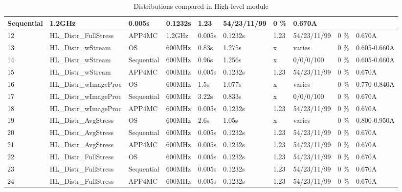 {\begin{table}[!ht]
{\begin{tabular}{|l|l|l|l|l|l|l|l|l|l|}
				Sequential &
				1.2GHz &
				0.005s &
				0.1232s &
				1.23 &
				54/23/11/99 &
				0 \% &
				0.670A \\
				\hline
				\hline
				12 &
				HL{\_}Distr{\_}FullStress &
				APP4MC &
				1.2GHz &
				0.005s &
				0.1232s &
				1.23 &
				54/23/11/99 &
				0 \% &
				0.670A \\
				\hline
				\hline
				13 &
				HL{\_}Distr{\_}wStream &
				OS &
				600MHz &
				0.83s &
				1.275s &
				x &
				varies &
				0 \% &
				0.605-0.660A \\
				\hline
				\hline
				14 &
				HL{\_}Distr{\_}wStream &
				Sequential &
				600MHz &
				0.96s &
				1.256s &
				x &
				0/0/0/100 &
				0 \% &
				0.605-0.660A \\
				\hline
				\hline
				15 &
				HL{\_}Distr{\_}wStream &
				APP4MC &
				600MHz &
				0.005s &
				0.1232s &
				1.23 &
				54/23/11/99 &
				0 \% &
				0.670A \\
				\hline
				\hline
				16 &
				HL{\_}Distr{\_}wImageProc &
				OS &
				600MHz &
				1.5s &
				1.077s &
				x &
				varies&
				0 \% &
				0.770-0.840A \\
				\hline
				\hline
				17 &
				HL{\_}Distr{\_}wImageProc &
				Sequential &
				600MHz &
				3.22s &
				0.833s &
				x &
				0/0/0/100 &
				0 \% &
				0.670A \\
				\hline
				\hline
				18 &
				HL{\_}Distr{\_}wImageProc &
				APP4MC &
				600MHz &
				0.005s &
				0.1232s &
				1.23 &
				54/23/11/99 &
				0 \% &
				0.670A \\
				\hline
				\hline
				19 &
				HL{\_}Distr{\_}AvgStress &
				OS &
				600MHz &
				2.6s &
				1.05s &
				x &
				varies  &
				0 \% &
				0.800-0.950A \\
				\hline
				\hline
				20 &
				HL{\_}Distr{\_}AvgStress &
				Sequential &
				600MHz &
				0.005s &
				0.1232s &
				1.23 &
				54/23/11/99 &
				0 \% &
				0.670A \\
				\hline
				\hline
				21 &
				HL{\_}Distr{\_}AvgStress &
				APP4MC &
				600MHz &
				0.005s &
				0.1232s &
				1.23 &
				54/23/11/99 &
				0 \% &
				0.670A \\
				\hline
				\hline
				22 &
				HL{\_}Distr{\_}FullStress &
				OS &
				600MHz &
				0.005s &
				0.1232s &
				1.23 &
				54/23/11/99 &
				0 \% &
				0.670A \\
				\hline
				\hline
				23 &
				HL{\_}Distr{\_}FullStress &
				Sequential &
				600MHz &
				0.005s &
				0.1232s &
				1.23 &
				54/23/11/99 &
				0 \% &
				0.670A \\
				\hline
				\hline
				24 &
				HL{\_}Distr{\_}FullStress &
				APP4MC &
				600MHz &
				0.005s &
				0.1232s &
				1.23 &
				54/23/11/99 &
				0 \% &
				0.670A \\
				\hline
			\end{tabular}
			}
			\caption{Distributions compared in High-level module}
			\label{tbl_hlcomparison}
		\end{table}
}

